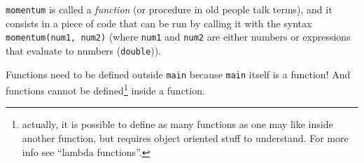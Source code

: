 \documentclass[]{book}
\begin{document}
\begin{minipage}{\linewidth}
\begin{minipage}[t]{.485\linewidth}
\begin{framed}
\end{framed}

\texttt{momentum} is called a \emph{function} (or procedure in old
people talk terms), and it consists in a piece of code that can be run
by calling it with the syntax \texttt{momentum(num1,\ num2)} (where
\texttt{num1} and \texttt{num2} are either numbers or expressions that
evaluate to numbers (\texttt{double})).

Functions need to be defined outside \texttt{main} because \texttt{main}
itself is a function! And functions cannot be defined\footnote{actually,
  it is possible to define as many functions as one may like inside
  another function, but requires object oriented stuff to understand.
  For more info see ``lambda functions''.} inside a function.

\end{minipage}
\end{minipage}

\vspace{2mm}\noindent\hrulefill{}
\end{document}
